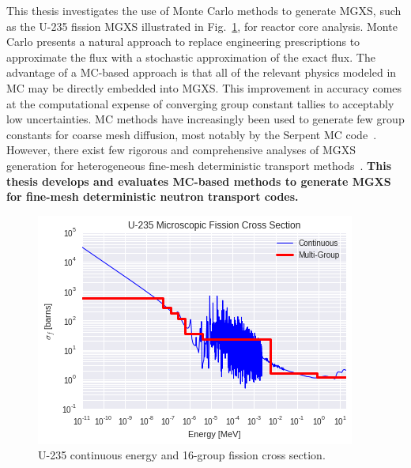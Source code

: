 \documentclass[12pt,twoside]{mitthesis-exec}
\begin{document}


This thesis investigates the use of Monte Carlo methods to generate MGXS, such as the U-235 fission MGXS illustrated in Fig.~\ref{fig:u235-sigf}, for reactor core analysis. Monte Carlo presents a natural approach to replace engineering prescriptions to approximate the flux with a stochastic approximation of the exact flux. The advantage of a MC-based approach is that all of the relevant physics modeled in MC may be directly embedded into MGXS. This improvement in accuracy comes at the computational expense of converging group constant tallies to acceptably low uncertainties. MC methods have increasingly been used to generate few group constants for coarse mesh diffusion, most notably by the Serpent MC code~\cite{serpent2013manual}. However, there exist few rigorous and comprehensive analyses of MGXS generation for heterogeneous fine-mesh deterministic transport methods~\cite{redmond1997multigroup,cai2014condensation,nelson2014improved}. \textbf{This thesis develops and evaluates MC-based methods to generate MGXS for fine-mesh deterministic neutron transport codes.}

\begin{figure}[h!]
\centering
\includegraphics[width=0.65\linewidth]{figures/intro/u235-ce-mg-xs}
\caption[U-235 continuous energy and multi-group fission cross section]{U-235 continuous energy and 16-group fission cross section.}
\label{fig:u235-sigf}
\end{figure}
\end{document}
